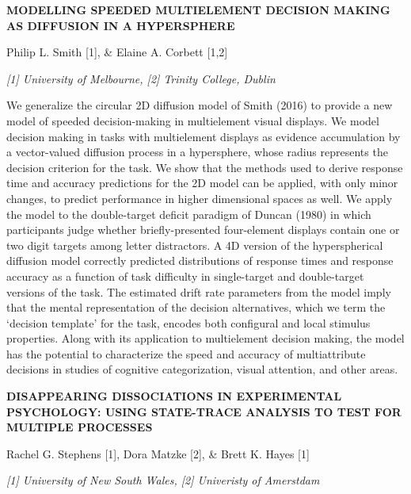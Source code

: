 \documentclass[]{article}
\begin{document}
\textbf{MODELLING SPEEDED MULTIELEMENT DECISION MAKING AS DIFFUSION IN A
HYPERSPHERE}

Philip L. Smith {[}1{]}, \& Elaine A. Corbett {[}1,2{]}

\emph{{[}1{]} University of Melbourne, {[}2{]} Trinity College, Dublin}

We generalize the circular 2D diffusion model of Smith (2016) to provide
a new model of speeded decision-making in multielement visual displays.
We model decision making in tasks with multielement displays as evidence
accumulation by a vector-valued diffusion process in a hypersphere,
whose radius represents the decision criterion for the task. We show
that the methods used to derive response time and accuracy predictions
for the 2D model can be applied, with only minor changes, to predict
performance in higher dimensional spaces as well. We apply the model to
the double-target deficit paradigm of Duncan (1980) in which
participants judge whether briefly-presented four-element displays
contain one or two digit targets among letter distractors. A 4D version
of the hyperspherical diffusion model correctly predicted distributions
of response times and response accuracy as a function of task difficulty
in single-target and double-target versions of the task. The estimated
drift rate parameters from the model imply that the mental
representation of the decision alternatives, which we term the `decision
template' for the task, encodes both configural and local stimulus
properties. Along with its application to multielement decision making,
the model has the potential to characterize the speed and accuracy of
multiattribute decisions in studies of cognitive categorization, visual
attention, and other areas.

\textbf{DISAPPEARING DISSOCIATIONS IN EXPERIMENTAL PSYCHOLOGY: USING
STATE-TRACE ANALYSIS TO TEST FOR MULTIPLE PROCESSES}

Rachel G. Stephens {[}1{]}, Dora Matzke {[}2{]}, \& Brett K. Hayes
{[}1{]}

\emph{{[}1{]} University of New South Wales, {[}2{]} Univeristy of
Amerstdam}
\end{document}
